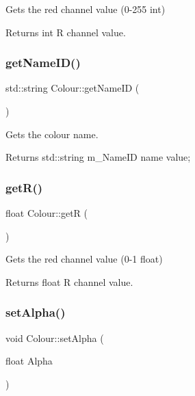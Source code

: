 Gets the red channel value (0-\/255 int) 

\begin{DoxyReturn}{Returns}
int R channel value. 
\end{DoxyReturn}
\mbox{\label{classColour_a5f5329e70ac61e998658b4586ddfa753}} 
\subsubsection{\texorpdfstring{get\+Name\+I\+D()}{getNameID()}}
{\footnotesize\ttfamily std\+::string Colour\+::get\+Name\+ID (\begin{DoxyParamCaption}{ }\end{DoxyParamCaption})\hspace{0.3cm}{\ttfamily [inline]}}



Gets the colour name. 

\begin{DoxyReturn}{Returns}
std\+::string m\+\_\+\+Name\+ID name value; 
\end{DoxyReturn}
\mbox{\label{classColour_a6237399e251d876aefe5d583ad251973}} 
\subsubsection{\texorpdfstring{get\+R()}{getR()}}
{\footnotesize\ttfamily float Colour\+::getR (\begin{DoxyParamCaption}{ }\end{DoxyParamCaption})\hspace{0.3cm}{\ttfamily [inline]}}



Gets the red channel value (0-\/1 float) 

\begin{DoxyReturn}{Returns}
float R channel value. 
\end{DoxyReturn}
\mbox{\label{classColour_a894ca29ba370974e7e0be904ca9ba65e}} 
\subsubsection{\texorpdfstring{set\+Alpha()}{setAlpha()}}
{\footnotesize\ttfamily void Colour\+::set\+Alpha (\begin{DoxyParamCaption}\item[{float}]{Alpha }\end{DoxyParamCaption})\hspace{0.3cm}{\ttfamily [inline]}}



